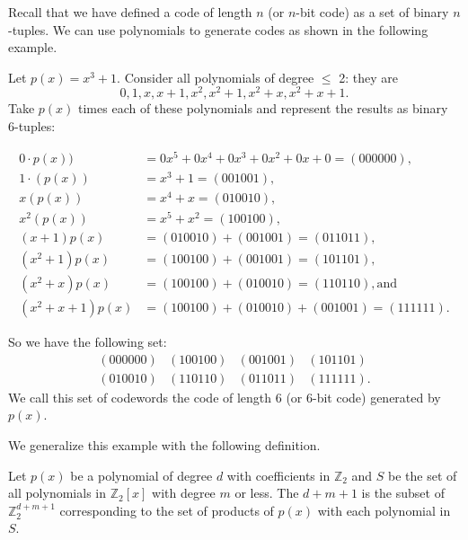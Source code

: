 Recall that we have defined a code of length $n$ (or $n$-bit code) as a set of binary $n$-tuples.  We can use polynomials to generate codes as shown in the following example. 

\begin{example}
Let $p(x) = x^3 + 1$.  Consider all polynomials of degree $\le$ 2: they are \[0, 1, x, x+1, x^2, x^2+1, x^2 + x, x^2 + x + 1.\]  Take $p(x)$ times each of these polynomials and represent the results as binary 6-tuples:

\begin{align*}
0\cdot p(x))&=0x^5+0x^4+0x^3+0x^2+0x+0=(000000),\\
1\cdot (p(x))&= x^3 + 1=(001001),\\ 
x(p(x))&=x^4+x= (010010),\\
x^2(p(x))&=x^5+x^2=(100100),\\
(x+1)p(x)&=(010010)+(001001)=(011011),\\
(x^2+1)p(x)&=(100100)+(001001)=(101101),\\ 
(x^2+x)p(x)&=(100100)+(010010)=(110110), \textrm{and}\\
(x^2+x+1)p(x)&=(100100)+(010010)+(001001)=(111111).
\end{align*}

So we have the following set:
 \[ \begin{array}{cccc}
(000000) & (100100) & (001001) & (101101) \\
(010010) & (110110) & (011011) & (111111).
\end{array}\]
We call this set of codewords the code of length 6 (or 6-bit code) generated by $p(x)$.
\end{example}

We generalize this example with the following definition.

\begin{defn}\label{definition:Polynomial Code Basics:polynomialcode}
Let $p(x)$ be a polynomial of degree $d$ with coefficients in $\mathbb{Z}_2$ and $S$ be the set of all polynomials in $\mathbb{Z}_2[x]$ with  degree $m$ or less. The   $d+m+1$  is the subset of $\mathbb{Z}_2^{d+m+1}$ corresponding to the set of products of $p(x)$ with each polynomial in $S$. 
\end{defn}

